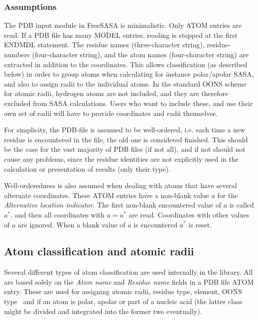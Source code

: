 \documentclass[a4paper,11pt]{article}
\begin{document}
\subsubsection{Assumptions}

The PDB input module in FreeSASA is minimalistic. Only ATOM entries are
read. If a PDB file has many MODEL entries, reading is stopped at the
first ENDMDL statement. The residue names (three-character string),
residue-numbers (four-character string), and the atom names
(four-character string) are extracted in addition to the
coordinates. This allows classification (as described below) in order
to group atoms when calculating for instance polar/apolar SASA, and
also to assign radii to the individual atoms. In the standard OONS
scheme for atomic radii, hydrogen atoms are not included, and they are
therefore excluded from SASA calculations. Users who want to include
these, and use their own set of radii will have to provide coordinates
 and radii themselves.

For simplicity, the PDB-file is assumed to be well-ordered, i.e. each
time a new residue is encountered in the file, the old one is
considered finished. This should be the case for the vast majority of
PDB files (if not all), and if not should not cause any problems,
since the residue identities are not explicitly used in the
calculation or presentation of results (only their type). 

Well-orderedness is also assumed when dealing with atoms that have
several alternate coordinates. These ATOM entries have a non-blank
value $a$ for the \emph{Alternative location indicator}. The first
non-blank encountered value of $a$ is called $a^*$, and then all
coordinates with $a = a^*$ are read. Coordinates with other values of
$a$ are ignored. When a blank value of $a$ is encountered $a^*$ is
reset.

\subsection{Atom classification and atomic radii}

Several different types of atom classification are used internally in
the library. All are based solely on the \emph{Atom name} and
\emph{Residue name} fields in a PDB file ATOM entry. These are used
for assigning atomic radii, residue type, element, OONS
type~\cite{OONS} and if an atom is polar, apolar or part of a nucleic
acid (the latter class might be divided and integrated into the former
two eventually).
\end{document}

